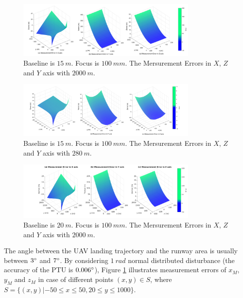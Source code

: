 \documentclass[journal,article,submit,moreauthors,pdftex,10pt,a4paper]{mdpi}
\begin{document}
\begin{figure}[t]
	\centering
	\includegraphics[width=0.8\textwidth]{Figs/Fig06_ErrorSurf2000.pdf}
	\caption{Baseline is $15\ m$. Focus is $100\ mm$. The Mersurement Errors in $X$, $Z$ and $Y$ axis with $2000\ m$.}
	\label{fig:Fig06_ErrorSurf2000}
\end{figure}

\begin{figure}[t]
	\centering
	\includegraphics[width=0.8\textwidth]{Figs/Fig07_ErrorSurf200.pdf}
	\caption{Baseline is $15\ m$. Focus is $100\ mm$. The Mersurement Errors in $X$, $Z$ and $Y$ axis with $280\ m$.}
	\label{fig:Fig06_ErrorSurf200}
\end{figure}


\begin{figure}[t]
	\centering
	\includegraphics[width=0.8\textwidth]{Figs/chp03_vision_15_long_range_error_d20_f100.pdf}
	\caption{Baseline is $20\ m$. Focus is $100\ mm$. The Mersurement Errors in $X$, $Z$ and $Y$ axis with $2000\ m$.}
	\label{fig:chp03_vision_15_long_range_error_d20_f100}
\end{figure}


The angle between the UAV landing trajectory and the runway area is usually between $3 \degree$ and $7 \degree$. By considering $1\ rad$ normal distributed disturbance (the accuracy of the PTU is $0.006 \degree$), Figure \ref{fig:Fig06_ErrorSurf2000} illustrates measurement errors of $x_M$, $y_M$ and $z_M$ in case of different points $(x,y) \in S$, where $S= \{ (x,y)| -50 \leq x \leq 50, 20 \leq y \leq 1000 \}$. 
\end{document}
